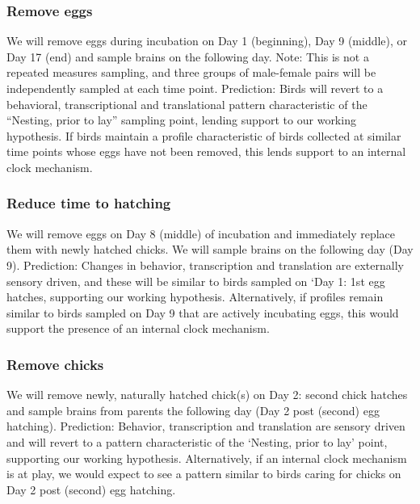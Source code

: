 \documentclass[10pt,letterpaper]{article}
\begin{document}
\hypertarget{remove-eggs}{%
\subsubsection{Remove eggs}\label{remove-eggs}}

We will remove eggs during incubation on Day 1 (beginning), Day 9
(middle), or Day 17 (end) and sample brains on the following day. Note:
This is not a repeated measures sampling, and three groups of
male-female pairs will be independently sampled at each time point.
Prediction: Birds will revert to a behavioral, transcriptional and
translational pattern characteristic of the ``Nesting, prior to lay''
sampling point, lending support to our working hypothesis. If birds
maintain a profile characteristic of birds collected at similar time
points whose eggs have not been removed, this lends support to an
internal clock mechanism.

\hypertarget{reduce-time-to-hatching}{%
\subsubsection{Reduce time to hatching}\label{reduce-time-to-hatching}}

We will remove eggs on Day 8 (middle) of incubation and immediately
replace them with newly hatched chicks. We will sample brains on the
following day (Day 9). Prediction: Changes in behavior, transcription
and translation are externally sensory driven, and these will be similar
to birds sampled on `Day 1: 1st egg hatches, supporting our working
hypothesis. Alternatively, if profiles remain similar to birds sampled
on Day 9 that are actively incubating eggs, this would support the
presence of an internal clock mechanism.

\hypertarget{remove-chicks}{%
\subsubsection{Remove chicks}\label{remove-chicks}}

We will remove newly, naturally hatched chick(s) on Day 2: second chick
hatches and sample brains from parents the following day (Day 2 post
(second) egg hatching). Prediction: Behavior, transcription and
translation are sensory driven and will revert to a pattern
characteristic of the `Nesting, prior to lay' point, supporting our
working hypothesis. Alternatively, if an internal clock mechanism is at
play, we would expect to see a pattern similar to birds caring for
chicks on Day 2 post (second) egg hatching.
\end{document}
